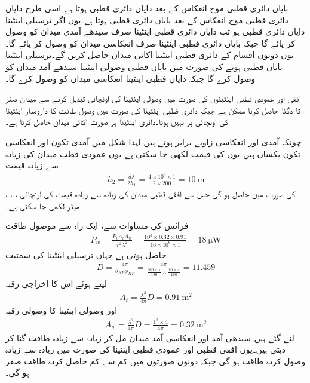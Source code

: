 بایاں دائری قطبی موج انعکاس کے بعد دایاں دائری قطبی ہوتا ہے۔اسی طرح دایاں دائری قطبی موج انعکاس کے بعد بایاں دائری قطبی ہوتا ہے۔یوں اگر ترسیلی اینٹینا دایاں دائری قطبی ہو تب دایاں دائری قطبی اینٹینا صرف سیدھے آمدی میدان کو وصول کر پائے گا جبکہ بایاں دائری قطبی اینٹینا صرف انعکاسی میدان کو وصول کر پائے گا۔یوں دونوں اقسام کے دائری قطبی اینٹینا اکائی میدان حاصل کریں گے۔ترسیلی اینٹینا بایاں قطبی ہونے کی صورت میں بایاں قطبی وصولی اینٹینا سیدھے آمد میدان کو وصول کرے گا جبکہ دایاں قطبی اینٹینا انعکاسی میدان کو وصول کرے گا۔

افقی اور عمودی قطبی اینٹینوں کی صورت میں وصولی اینٹینا کی اونچائی تبدیل کرنے سے میدان صفر تا دگنا حاصل کرنا ممکن ہے جبکہ دائری قطبی اینٹینا کی صورت میں وصول طاقت کا دارومدار اینٹینا کی اونچائی پر نہیں ہوتا۔دائری اینٹینا ہر صورت اکائی میدان حاصل کرتا ہے۔ 

چونکہ آمدی اور انعکاسی زاویے برابر ہوتے ہیں لہٰذا شکل میں آمدی تکون اور انعکاسی تکون یکساں ہیں۔یوں  کی قیمت  لکھی جا سکتی ہے۔یوں عمودی قطب میدان کی زیادہ سے زیادہ قیمت
\begin{align*}
h_2=\frac{d \lambda}{2 h_1}=\frac{4\times 10^3 \times 1}{2 \times 200}=\SI{10}{\meter}
\end{align*}
کی صورت میں حاصل ہو گی جس سے افقی قطبی میدان کی زیادہ سے زیادہ قیمت کی اونچائی ، ، ،  میٹر لکھی جا سکتی ہے۔

فرائس کی مساوات سے، ایک راہ سے موصول طاقت
\begin{align*}
P_w=\frac{P_t A_t A_w}{r^2 \lambda^2}=\frac{10^3\times0.32\times0.91}{16\times 10^6 \times 1}=\SI{18}{\micro \watt}
\end{align*}
حاصل ہوتی ہے جہاں ترسیلی اینٹینا کی سمتیت
\begin{align*}
D=\frac{4\pi}{\theta_{HP} \phi_{HP}}=\frac{4\pi}{\frac{360 \times \pi}{180} \times \frac{10 \times \pi}{180}}= 11.459
\end{align*}
لیتے ہوئے اس کا اخراجی رقبہ 
\begin{align*}
A_t=\frac{\lambda^2}{4\pi} D=\SI{0.91}{\meter \squared}
\end{align*}
اور وصولی اینٹینا کا وصولی رقبہ
\begin{align*}
A_w=\frac{\lambda^2}{4\pi}D=\frac{1^2 \times 4}{4\pi}=\SI{0.32}{\meter\squared}
\end{align*}
لئے گئے ہیں۔سیدھی آمد اور انعکاسی آمد میدان مل کر زیادہ سے زیادہ طاقت  گنا کر دیتی ہیں۔یوں افقی قطبی اور عمودی قطبی اینٹینا کی صورت میں زیادہ سے زیادہ وصول کردہ طاقت  ہو گی جبکہ دونوں صورتوں میں کم سے کم حاصل کردہ طاقت صفر ہو گی۔ 
 

